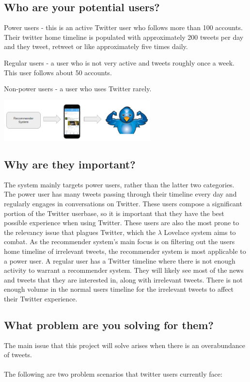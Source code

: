 \documentclass{article}
\begin{document}
\subsection{Who are your potential users?}
\begin{itemize*}
    \item Power users - this is an active Twitter user who follows more than 100 accounts. Their twitter home timeline is populated with approximately 200 tweets per day and they tweet, retweet or like approximately five times daily.
    \item Regular users - a user who is not very active and tweets roughly once a week. This user follows about 50 accounts.
    \item Non-power users - a user who uses Twitter rarely.
\end{itemize*} 

\includegraphics[width=0.6\textwidth, center]{twitter_power_user}

\subsection{Why are they important?}
The system mainly targets power users, rather than the latter two categories. The power user has many tweets passing through their timeline every day and regularly engages in conversations on Twitter. These users compose a significant portion of the Twitter userbase, so it is important that they have the best possible experience when using Twitter. These users are also the most prone to the relevancy issue that plagues Twitter, which the $\lambda$ Lovelace system aims to combat.
As the recommender system's main focus is on filtering out the users home timeline of irrelevant tweets, the recommender system is most applicable to a power user. A regular user has a Twitter timeline where there is not enough activity to warrant a recommender system. They will likely see most of the news and tweets that they are interested in, along with irrelevant tweets. There is not enough volume in the normal users timeline for the irrelevant tweets to affect their Twitter experience.

\subsection{What problem are you solving for them?}
The main issue that this project will solve arises when there is an overabundance of tweets.
\\\\
\noindent The following are two problem scenarios that twitter users currently face:
\end{document}
